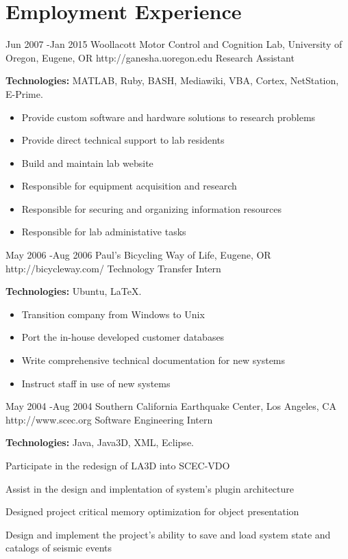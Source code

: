 \documentclass[10pt]{article} %
\begin{document}
\section{Employment Experience}

\job
{Jun 2007 -}{Jan 2015}
{Woollacott Motor Control and Cognition Lab, University of Oregon, Eugene, OR}
{http://ganesha.uoregon.edu}
{Research Assistant}
{\rule{0mm}{5mm}\textbf{Technologies:} MATLAB, Ruby, BASH, Mediawiki, VBA, Cortex, NetStation, E-Prime.

\begin{itemize}
\item{Provide custom software and hardware solutions to research problems}
\item{Provide direct technical support to lab residents}
\item{Build and maintain lab website}
\item{Responsible for equipment acquisition and research}
\item{Responsible for securing and organizing information resources}
\item{Responsible for lab administative tasks}
\end{itemize}

}


\job
{May 2006 -}{Aug 2006}
{Paul's Bicycling Way of Life, Eugene, OR}
{http://bicycleway.com/}
{Technology Transfer Intern}
{\rule{0mm}{5mm}\textbf{Technologies:} Ubuntu, LaTeX.

\begin{itemize}
\item{Transition company from Windows to Unix}
\item{Port the in-house developed customer databases}
\item{Write comprehensive technical documentation for new systems}
\item{Instruct staff in use of new systems}
\end{itemize}

}

\job
{May 2004 -}{Aug 2004}
{Southern California Earthquake Center, Los Angeles, CA}
{http://www.scec.org}
{Software Engineering Intern}
{\rule{0mm}{5mm}\textbf{Technologies:} Java, Java3D, XML, Eclipse.

\begin{itemize-noindent}
\item{Participate in the redesign of LA3D into SCEC-VDO}
\item{Assist in the design and implentation of system's plugin architecture}
\item{Designed project critical memory optimization for object presentation}
\item{Design and implement the project's ability to save and load system state and catalogs of seismic events}
\end{itemize-noindent}

}
\end{document}

